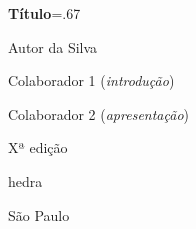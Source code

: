 




\begingroup\thispagestyle{empty}\vspace*{-.01\textheight}\parindent=0pt 
              \formular
              \Huge 
              \textbf{Título}\baselineskip=.67\baselineskip 

              \vspace{15mm}
              
              \LARGE
              Autor da Silva

              \vfill

              \newfontfamily{}
              {\selectfont\minion\small{}\baselineskip
              Colaborador 1 (\textit{introdução}) 

              Colaborador 2 (\textit{apresentação})\par
              }
\vspace{0.1cm}


              \vspace{0.5cm}
              
              {\selectfont\minion\footnotesize
   					  Xª edição}
                    
              \vfill

              \newfontfamily{}
              {\fontsize{30}{40}\selectfont \timesnewroman hedra}
              
              \medskip

              {\selectfont\minion\small
              São Paulo \quad\the\year}
\endgroup
\pagebreak

